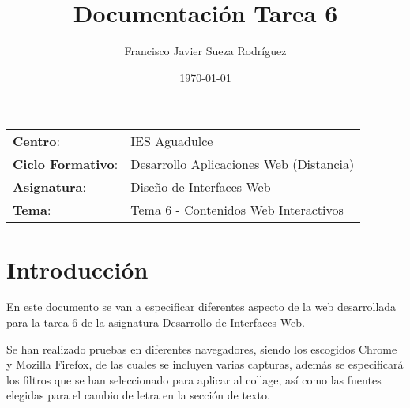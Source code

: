 


\title{
\vspace{10ex}
\normalfont \normalsize
\huge \textbf{Documentación Tarea 6}
}
\author{Francisco Javier Sueza Rodríguez}
\date{\normalsize\today}



\maketitle

\thispagestyle{empty}

\vspace{75ex}

\begin{center}
    \begin{tabular}{l l}
        \textbf{Centro}: & IES Aguadulce \\
        \textbf{Ciclo Formativo}: & Desarrollo Aplicaciones Web (Distancia)\\
        \textbf{Asignatura}: & Diseño de Interfaces Web\\
        \textbf{Tema}: & Tema 6 -  Contenidos Web Interactivos\\
    \end{tabular}
\end{center}

\newpage

\section{Introducción}
En este documento se van a especificar diferentes aspecto de la web desarrollada para la tarea 6 de la asignatura Desarrollo de Interfaces Web.

Se han realizado pruebas en diferentes navegadores, siendo los escogidos Chrome y Mozilla Firefox, de las cuales se incluyen varias capturas, además se especificará los filtros que se han seleccionado para aplicar al collage, así como las fuentes elegidas para el cambio de letra en la sección de texto.

